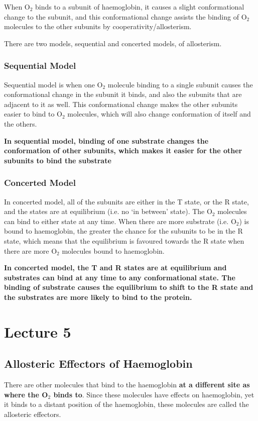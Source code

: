 \documentclass[a4paper, 12pt]{report}
\newcommand{\mychapter}[2]{
    \setcounter{chapter}{#1}
    \setcounter{section}{0}
    \chapter*{#2}
    \addcontentsline{toc}{chapter}{#2}
}
\begin{document}
When O$_2$ binds to a subunit of haemoglobin, it causes a slight conformational change to the subunit, and this conformational change assists the binding of O$_2$ molecules to the other subunits by cooperativity/allosterism.

There are two models, sequential and concerted models, of allosterism.

\subsection{Sequential Model}

Sequential model is when one O$_2$ molecule binding to a single subunit causes the conformational change in the subunit it binds, and also the subunits that are adjacent to it as well.
This conformational change makes the other subunits easier to bind to O$_2$ molecules, which will also change conformation of itself and the others.

\textbf{In sequential model, binding of one substrate changes the conformation of other subunits, which makes it easier for the other subunits to bind the substrate}

\subsection{Concerted Model}

In concerted model, all of the subunits are either in the T state, or the R state, and the states are at equilibrium (i.e. no `in between' state).
The O$_2$ molecules can bind to either state at any time.
When there are more substrate (i.e. O$_2$) is bound to haemoglobin, the greater the chance for the subunits to be in the R state, which means that the equilibrium is favoured towards the R state when there are more O$_2$ molecules bound to haemoglobin.

\textbf{ In concerted model, the T and R states are at equilibrium and substrates can bind at any time to any conformational state. The binding of substrate causes the equilibrium to shift to the R state and the substrates are more likely to bind to the protein.}

\mychapter{5}{Lecture 5}

\section{Allosteric Effectors of Haemoglobin}

There are other molecules that bind to the haemoglobin \textbf{at a different site as where the O$_2$ binds to}.
Since these molecules have effects on haemoglobin, yet it binds to a distant position of the haemoglobin, these molecules are called the allosteric effectors.
\end{document}
